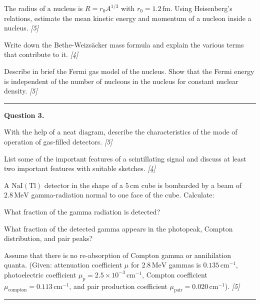 \documentclass[11pt,a4paper]{article}
\newcommand{\pts}[1]{\hfill   \textit{[#1]}}
\begin{document}
\begin{parts}
  \item The radius of a nucleus is $R = r_0 A^{1/3}$ with $r_0 = 1.2\, \text{fm}$. Using Heisenberg's relations, estimate the mean kinetic energy and momentum of a nucleon inside a nucleus. \pts{5}
  \item Write down the Bethe-Weizs\"{a}cker mass formula and explain the various terms that contribute to it. \pts{4}
  \item Describe in brief the Fermi gas model of the nucleus. Show that the Fermi energy is independent of the number of nucleons in the nucleus for constant nuclear density. \pts{5}
\end{parts}

\medskip\rule{\linewidth}{0.2pt}




\noindent   \textbf{Question 3.}

\begin{parts}
  \item With the help of a neat diagram, describe the characteristics of the mode of operation of gas-filled detectors. \pts{5}
  \item List some of the important features of a scintillating signal and discuss at least two important features with suitable sketches. \pts{4}
  \item A $ \text{NaI}( \text{Tl})$ detector in the shape of a $5\, \text{cm}$ cube is bombarded by a beam of $2.8\, \text{MeV}$ gamma-radiation normal to one face of the cube. Calculate:
    
\begin{parts}
      \item What fraction of the gamma radiation is detected?
      \item What fraction of the detected gamma appears in the photopeak, Compton distribution, and pair peaks?
    \end{parts}
    Assume that there is no re-absorption of Compton gamma or annihilation quanta. (Given: attenuation coefficient $\mu$ for $2.8\, \text{MeV}$ gammas is $0.135\, \text{cm}^{-1}$, photoelectric coefficient $\mu_p = 2.5  \times 10^{-3}\, \text{cm}^{-1}$, Compton coefficient $\mu_{ \text{compton}} = 0.113\, \text{cm}^{-1}$, and pair production coefficient $\mu_{ \text{pair}} = 0.020\, \text{cm}^{-1}$). \pts{5}
\end{parts}

\medskip\rule{\linewidth}{0.2pt}
\end{document}
